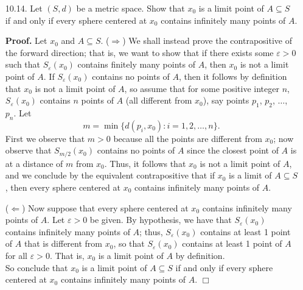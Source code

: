 \documentclass[9pt]{article}
\newcommand{\qed}{\hfill \ensuremath{\Box}}
\begin{document}
\begin{enumerate}
   \item[10.14.]  Let $(S, d)$ be a metric space. Show that $x_0$ is a limit
                  point of $A \subseteq S$ if and only if every sphere centered
                  at $x_0$ contains infinitely many points of $A$.

      \textbf{Proof.} Let $x_0$ and $A \subseteq S$. ($\Rightarrow$) We shall
      instead prove the contrapositive of the forward direction; that is, we
      want to show that if there exists some $\varepsilon > 0$ such that
      $S_\varepsilon(x_0)$ contains finitely many points of $A$, then $x_0$ is
      not a limit point of $A$. If $S_\varepsilon(x_0)$ contains no points of
      $A$, then it follows by definition that $x_0$ is not a limit point of $A$,
      so assume that for some positive integer $n$, $S_\varepsilon(x_0)$
      contains $n$ points of $A$ (all different from $x_0$), say points $p_1$,
      $p_2$, $\ldots$, $p_n$. Let
      $$m = \min\{d(p_i, x_0) : i = 1, 2, \ldots, n\}.$$
      First we observe that $m > 0$ because all the points are different from
      $x_0$; now observe that $S_{m/2}(x_0)$ contains no points of $A$ since the
      closest point of $A$ is at a distance of $m$ from $x_0$. Thus, it follows
      that $x_0$ is not a limit point of $A$, and we conclude by the
      equivalent contrapositive that if $x_0$ is a limit of $A \subseteq S$,
      then every sphere centered at $x_0$ contains infinitely many points of
      $A$.
      
      ($\Leftarrow$) Now suppose that every sphere centered at $x_0$ contains
      infinitely many points of $A$. Let $\varepsilon > 0$ be given. By
      hypothesis, we have that $S_\varepsilon(x_0)$ contains infinitely many
      points of $A$; thus, $S_\varepsilon(x_0)$ contains at least 1 point of $A$
      that is different from $x_0$, so that $S_\varepsilon(x_0)$ contains at
      least 1 point of $A$ for all $\varepsilon > 0$. That is, $x_0$ is a limit
      point of $A$ by definition. \\
      
      So conclude that  $x_0$ is a limit point of $A \subseteq S$ if and only if
      every sphere centered at $x_0$ contains infinitely many points of $A$.
      \qed
\end{enumerate}
\end{document}
